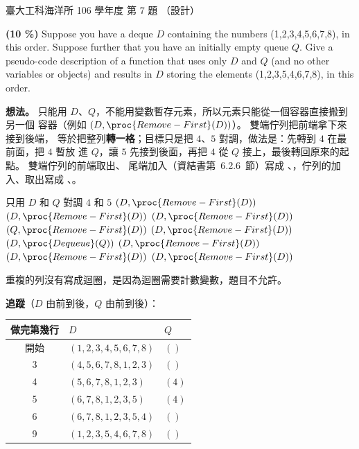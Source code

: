 \begin{pastexam}[label={px:ntu-106-esoe-ds-07}]{臺大工科海洋所 106 學年度 第 7 題}
（設計）

\textbf{(10 \%)} Suppose you have a deque $D$ containing the numbers (1,2,3,4,5,6,7,8), in this
order. Suppose further that you have an initially empty queue $Q$. Give a pseudo-code
description of a function that uses only $D$ and $Q$ (and no other variables or objects) and
results in $D$ storing the elements (1,2,3,5,4,6,7,8), in this order.
\end{pastexam}

\begin{pastsoln}
\textbf{想法。} 只能用 $D$、$Q$，不能用變數暫存元素，所以元素只能從一個容器直接搬到另一個
容器（例如 $(D, \proc{Remove-First}(D))$）。 雙端佇列把前端拿下來接到後端，
等於把整列\textbf{轉一格}；目標只是把 $4$、$5$ 對調，做法是：先轉到 $4$ 在最前面，把 $4$ 暫放
進 $Q$，讓 $5$ 先接到後面，再把 $4$ 從 $Q$ 接上，最後轉回原來的起點。 雙端佇列的前端取出、
尾端加入（資結書第~6.2.6~節）寫成 、，佇列的加入、取出寫成
、。

\begin{pseudo}{只用 $D$ 和 $Q$ 對調 $4$ 和 $5$}
    \State {}$(D, \proc{Remove-First}(D))$ 
    \State {}$(D, \proc{Remove-First}(D))$ 
    \State {}$(D, \proc{Remove-First}(D))$ 
    \State {}$(Q, \proc{Remove-First}(D))$ 
    \State {}$(D, \proc{Remove-First}(D))$ 
    \State {}$(D, \proc{Dequeue}(Q))$ 
    \State {}$(D, \proc{Remove-First}(D))$ 
    \State {}$(D, \proc{Remove-First}(D))$ 
    \State {}$(D, \proc{Remove-First}(D))$ 
\EndProcedure
\end{pseudo}
重複的列沒有寫成迴圈，是因為迴圈需要計數變數，題目不允許。

\textbf{追蹤}（$D$ 由前到後，$Q$ 由前到後）：
\begin{center}
\begin{tabular}{cll}
\toprule
做完第幾行 & $D$ & $Q$ \\
\midrule
開始 & $(1, 2, 3, 4, 5, 6, 7, 8)$ & $()$ \\
3 & $(4, 5, 6, 7, 8, 1, 2, 3)$ & $()$ \\
4 & $(5, 6, 7, 8, 1, 2, 3)$ & $(4)$ \\
5 & $(6, 7, 8, 1, 2, 3, 5)$ & $(4)$ \\
6 & $(6, 7, 8, 1, 2, 3, 5, 4)$ & $()$ \\
9 & $(1, 2, 3, 5, 4, 6, 7, 8)$ & $()$ \\
\bottomrule
\end{tabular}
\end{center}


\end{pastsoln}
